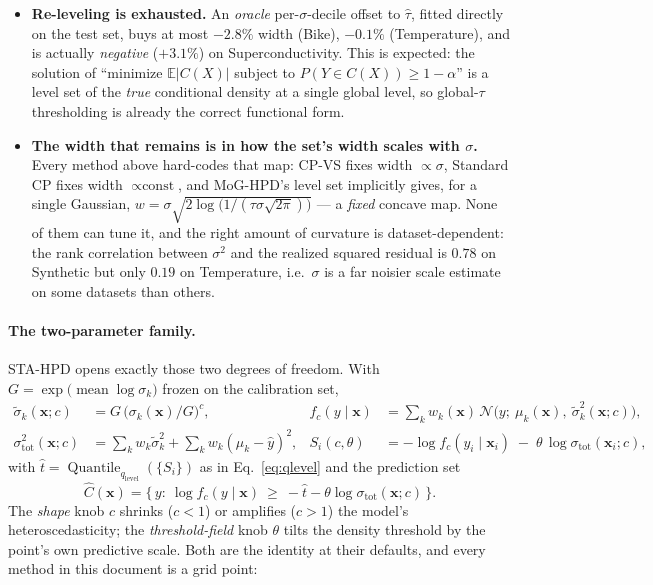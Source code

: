 \documentclass[11pt]{article}
\begin{document}
\begin{itemize}
\item \textbf{Re-leveling is exhausted.} An \emph{oracle} per-$\sigma$-decile offset to $\hat\tau$,
fitted directly on the test set, buys at most $-2.8\%$ width (Bike), $-0.1\%$ (Temperature), and
is actually \emph{negative} ($+3.1\%$) on Superconductivity. This is expected: the solution of
``minimize $\mathbb E|C(X)|$ subject to $P(Y\in C(X))\ge 1-\alpha$'' is a level set of the
\emph{true} conditional density at a single global level, so global-$\tau$ thresholding is
already the correct functional form.
\item \textbf{The width that remains is in how the set's width scales with $\sigma$.} Every method
above hard-codes that map: CP-VS fixes width $\propto\sigma$, Standard CP fixes width
$\propto\text{const}$, and MoG-HPD's level set implicitly gives, for a single Gaussian,
$w=\sigma\sqrt{2\log\!\big(1/(\tau\sigma\sqrt{2\pi})\big)}$ --- a \emph{fixed} concave map. None of
them can tune it, and the right amount of curvature is dataset-dependent: the rank correlation
between $\sigma^2$ and the realized squared residual is $0.78$ on Synthetic but only $0.19$ on
Temperature, i.e.\ $\sigma$ is a far noisier scale estimate on some datasets than others.
\end{itemize}

\paragraph{The two-parameter family.} STA-HPD opens exactly those two degrees of freedom. With
$G=\exp\big(\operatorname{mean}\log\sigma_k\big)$ frozen on the calibration set,
\begin{align}
\tilde\sigma_k(\bm x; c) &= G\,\big(\sigma_k(\bm x)/G\big)^{c}, &
f_c(y\mid\bm x) &= \sum_k w_k(\bm x)\,\mathcal N\big(y;\ \mu_k(\bm x),\ \tilde\sigma_k^2(\bm
x;c)\big),
\label{eq:sta-shape}\\
\sigma_{\mathrm{tot}}^2(\bm x;c) &= \textstyle\sum_k w_k\tilde\sigma_k^2 + \sum_k w_k(\mu_k-\hat
y)^2, &
S_i(c,\theta) &= -\log f_c(y_i\mid \bm x_i) \;-\; \theta\,\log\sigma_{\mathrm{tot}}(\bm x_i;c),
\label{eq:sta-score}
\end{align}
with $\hat t=\operatorname{Quantile}_{q_{\mathrm{level}}}(\{S_i\})$ as in
Eq.~\eqref{eq:qlevel} and the prediction set
\begin{equation}
\hat C(\bm x)=\big\{\,y:\ \log f_c(y\mid\bm x)\ \ge\ -\hat t-\theta\log\sigma_{\mathrm{tot}}(\bm
x;c)\,\big\}.
\label{eq:sta-region}
\end{equation}
The \emph{shape} knob $c$ shrinks ($c<1$) or amplifies ($c>1$) the model's heteroscedasticity; the
\emph{threshold-field} knob $\theta$ tilts the density threshold by the point's own predictive
scale. Both are the identity at their defaults, and every method in this document is a grid point:
\end{document}
